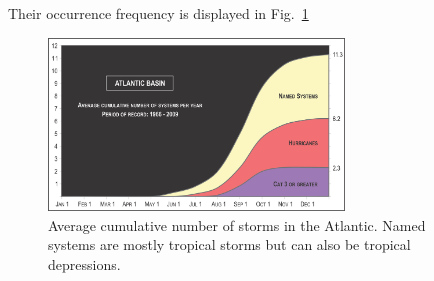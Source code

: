 Their occurrence frequency is displayed in Fig.~\ref{fig:cat-climatology}
\begin{figure}[ht]
	\centering
	\includegraphics[width=0.7\textwidth]{img/cum-average-cat.png}
	\caption{Average cumulative number of storms in the Atlantic. Named systems are mostly tropical storms but can also be tropical depressions.\cite{climatology}}
	\label{fig:cat-climatology}
\end{figure}

